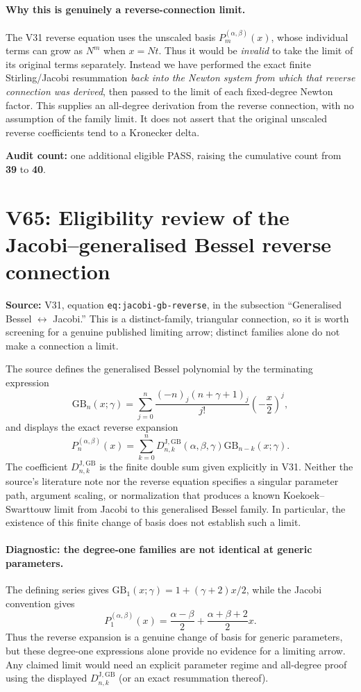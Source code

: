 \documentclass[11pt]{article}
\begin{document}
\paragraph{Why this is genuinely a reverse-connection limit.}
The V31 reverse equation uses the unscaled basis $P_m^{(\alpha,\beta)}(x)$, whose individual terms can grow as $N^m$ when $x=Nt$. Thus it would be \emph{invalid} to take the limit of its original terms separately. Instead we have performed the exact finite Stirling/Jacobi resummation \emph{back into the Newton system from which that reverse connection was derived}, then passed to the limit of each fixed-degree Newton factor. This supplies an all-degree derivation from the reverse connection, with no assumption of the family limit. It does not assert that the original unscaled reverse coefficients tend to a Kronecker delta.

\noindent\textbf{Audit count:} one additional eligible PASS, raising the cumulative count from \textbf{39} to \textbf{40}.


\section{V65: Eligibility review of the Jacobi--generalised Bessel reverse connection}
\noindent\textbf{Source:} V31, equation \texttt{eq:jacobi-gb-reverse}, in the subsection ``Generalised Bessel $\leftrightarrow$ Jacobi.'' This is a distinct-family, triangular connection, so it is worth screening for a genuine published limiting arrow; distinct families alone do not make a connection a limit.

The source defines the generalised Bessel polynomial by the terminating expression
\[
\mathrm{GB}_n(x;\gamma)=\sum_{j=0}^{n}
\frac{(-n)_j(n+\gamma+1)_j}{j!}\left(-\frac{x}{2}\right)^j,
\]
and displays the exact reverse expansion
\[
P_n^{(\alpha,\beta)}(x)=\sum_{k=0}^{n}
D_{n,k}^{\mathrm{J,GB}}(\alpha,\beta,\gamma)
\mathrm{GB}_{n-k}(x;\gamma).
\]
The coefficient $D_{n,k}^{\mathrm{J,GB}}$ is the finite double sum given explicitly in V31. Neither the source's literature note nor the reverse equation specifies a singular parameter path, argument scaling, or normalization that produces a known Koekoek--Swarttouw limit from Jacobi to this generalised Bessel family. In particular, the existence of this finite change of basis does not establish such a limit.

\paragraph{Diagnostic: the degree-one families are not identical at generic parameters.}
The defining series gives $\mathrm{GB}_1(x;\gamma)=1+(\gamma+2)x/2$, while the Jacobi convention gives
\[
P_1^{(\alpha,\beta)}(x)=\frac{\alpha-\beta}{2}+\frac{\alpha+\beta+2}{2}x.
\]
Thus the reverse expansion is a genuine change of basis for generic parameters, but these degree-one expressions alone provide no evidence for a limiting arrow. Any claimed limit would need an explicit parameter regime and all-degree proof using the displayed $D_{n,k}^{\mathrm{J,GB}}$ (or an exact resummation thereof).
\end{document}
